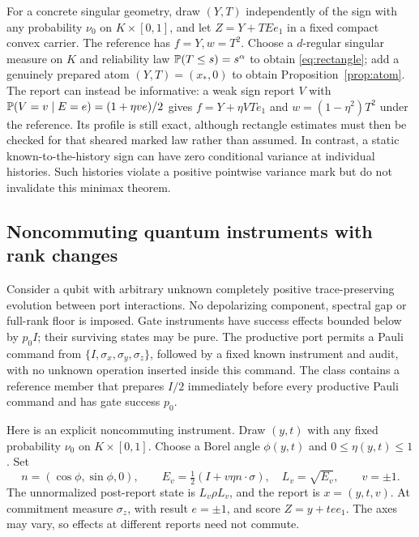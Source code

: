 For a concrete singular geometry, draw $(Y,T)$ independently of the sign with any probability $\nu_0$ on $K\times[0,1]$, and let $Z=Y+TEe_1$ in a fixed compact convex carrier. The reference has $f=Y,w=T^2$. Choose a $d$-regular singular measure on $K$ and reliability law $\mathbb P(T\le s)=s^\alpha$ to obtain \eqref{eq:rectangle}; add a genuinely prepared atom $(Y,T)=(x_*,0)$ to obtain Proposition~\ref{prop:atom}. The report can instead be informative: a weak sign report $V$ with $\mathbb P(V=v\mid E=e)=(1+\eta ve)/2$ gives $f=Y+\eta VT e_1$ and $w=(1-\eta^2)T^2$ under the reference. Its profile is still exact, although rectangle estimates must then be checked for that sheared marked law rather than assumed. In contrast, a static known-to-the-history sign can have zero conditional variance at individual histories. Such histories violate a positive pointwise variance mark but do not invalidate this minimax theorem.

\subsection*{Noncommuting quantum instruments with rank changes}
Consider a qubit with arbitrary unknown completely positive trace-preserving evolution between port interactions. No depolarizing component, spectral gap or full-rank floor is imposed. Gate instruments have success effects bounded below by $p_0I$; their surviving states may be pure. The productive port permits a Pauli command from $\{I,\sigma_x,\sigma_y,\sigma_z\}$, followed by a fixed known instrument and audit, with no unknown operation inserted inside this command. The class contains a reference member that prepares $I/2$ immediately before every productive Pauli command and has gate success $p_0$.

Here is an explicit noncommuting instrument. Draw $(y,t)$ with any fixed probability $\nu_0$ on $K\times[0,1]$. Choose a Borel angle $\phi(y,t)$ and $0\le\eta(y,t)\le1$. Set
\[
 n=(\cos\phi,\sin\phi,0),\qquad
 E_v=\tfrac12(I+v\eta n\cdot\sigma),\quad L_v=\sqrt{E_v},\qquad v=\pm1.
\]
The unnormalized post-report state is $L_v\rho L_v$, and the report is $x=(y,t,v)$. At commitment measure $\sigma_z$, with result $e=\pm1$, and score $Z=y+te e_1$. The axes may vary, so effects at different reports need not commute.

